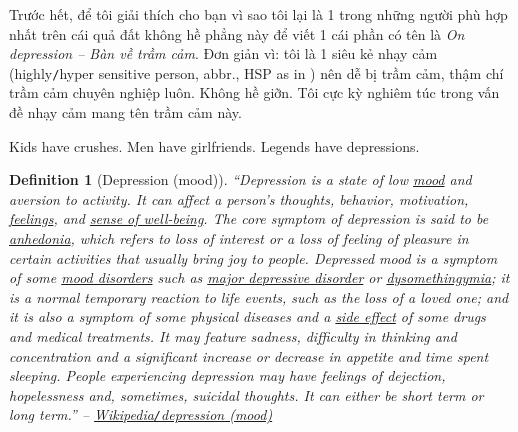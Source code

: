\documentclass[12pt,twoside]{book}
\newtheorem{definition}{Definition}[section]
\begin{document}
Trước hết, để tôi giải thích cho bạn vì sao tôi lại là 1 trong những người phù hợp nhất trên cái quả đất không hề phẳng này để viết 1 cái phần có tên là {\it On depression -- Bàn về trầm cảm}. Đơn giản vì: tôi là 1 siêu kẻ nhạy cảm (highly{\tt/}hyper sensitive person, abbr., HSP as in \cite{Aron_HSP}) nên dễ bị trầm cảm, thậm chí trầm cảm chuyên nghiệp luôn. Không hề giỡn. Tôi cực kỳ nghiêm túc trong vấn đề nhạy cảm mang tên trầm cảm này.

Kids have crushes. Men have girlfriends. Legends have depressions.

\begin{definition}[Depression (mood)]
	``\emph{Depression} is a state of low \href{https://en.wikipedia.org/wiki/Mood_(psychology)}{mood} and aversion to activity. It can affect a person's thoughts, behavior, motivation, \href{https://en.wikipedia.org/wiki/Feeling}{feelings}, and \href{https://en.wikipedia.org/wiki/Subjective_well-being}{sense of well-being}. The core symptom of depression is said to be \href{https://en.wikipedia.org/wiki/Anhedonia}{anhedonia}, which refers to loss of interest or a loss of feeling of pleasure in certain activities that usually bring joy to people. Depressed mood is a symptom of some \href{https://en.wikipedia.org/wiki/Mood_disorders}{mood disorders} such as \href{https://en.wikipedia.org/wiki/Major_depressive_disorder}{major depressive disorder} or \href{https://en.wikipedia.org/wiki/Dysomethingymia}{dysomethingymia}; it is a normal temporary reaction to life events, such as the loss of a loved one; and it is also a symptom of some physical diseases and a \href{https://en.wikipedia.org/wiki/Side_effect}{side effect} of some drugs and medical treatments. It may feature sadness, difficulty in thinking and concentration and a significant increase or decrease in appetite and time spent sleeping. People experiencing depression may have feelings of dejection, hopelessness and, sometimes, suicidal thoughts. It can either be short term or long term.'' -- \href{https://en.wikipedia.org/wiki/Depression_(mood)}{Wikipedia{\tt/}depression (mood)}
\end{definition}
\end{document}
